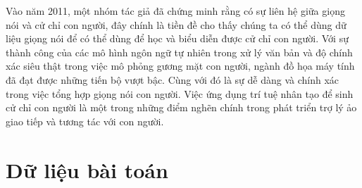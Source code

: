 Vào năm 2011, một nhóm tác giả \cite{bergmann2011relation} đã chứng minh rằng có sự liên hệ giữa giọng nói và cử chỉ con người, đây chính là tiền đề cho thấy chúng ta có thể dùng dữ liệu giọng nói để có thể dùng để học và biểu diễn được cử chỉ con người.
Với sự thành công của các mô hình ngôn ngữ tự nhiên trong xử lý văn bản và độ chính xác siêu thật trong việc mô phỏng gương mặt con người, ngành đồ họa máy tính đã đạt được những tiến bộ vượt bậc. Cùng với đó là sự dễ dàng và chính xác trong việc tổng hợp giọng nói con người.
Việc ứng dụng trí tuệ nhân tạo để sinh cử chỉ con người là một trong những điểm nghẽn chính trong phát triển trợ lý ảo giao tiếp và tương tác với con người.

\section{Dữ liệu bài toán}
\label{sec:Data}


